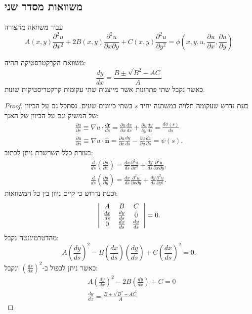 \documentclass{tstextbook}
\begin{document}
\subsection{משוואות מסדר שני}

\begin{definition}
עבור משוואה מהצורה 
$$ A(x,y)\frac{\partial^2u}{\partial x^2}\!+\!2B(x,y)\frac{\partial^2u}{\partial x\partial y}\!+\!C(x,y)\frac{\partial^2u}{\partial y^2}\!=\!\phi\left(\!x,\!y,\!u,\!\!\frac{\partial u}{\partial x},\!\!\frac{\partial u}{\partial y}\right)$$

\end{definition}
\begin{proposition}
משוואת הקרקטרסטיקה תהיה:
$$\frac{dy}{dx}=\frac{B\pm\sqrt{B^2-AC}}{A}$$
כאשר נקבל שתי פתרונות אשר מייצגות שתי עקומות קרקטריסטיקות שונות.

\end{proposition}
\begin{proof}
כעת נדרש שעקומה תלויה במשתנה יחיד \(s\) בשתי כיוונים שונים. נסתכל גם על הכיוון של המשיק וגם על הכיוון של האנך:
$$\begin{array}{l}{{{\frac{\partial u}{\partial s}}\equiv\nabla u\cdot{\frac{d\mathbf{r}}{d s}}={\frac{\partial u}{\partial x}}{\frac{d x}{d s}}+{\frac{\partial u}{\partial y}}{\frac{d y}{d s}}={\frac{d\phi(s)}{d s}}}}\\ {{{\frac{\partial u}{\partial n}}\equiv\nabla u\cdot{\hat{\mathbf{n}}}={\frac{\partial u}{\partial x}}{\frac{d y}{d s}}-{\frac{\partial u}{\partial y}}{\frac{d x}{d s}}=\psi(s).}}\end{array}$$
בעזרת כלל השרשרת ניתן לכתוב:
$$\begin{array}{l}{{\frac{d}{d s}\left(\frac{\partial u}{\partial x}\right)=\frac{d x}{d s}\frac{\partial^{2}u}{\partial x^{2}}+\frac{d y}{d s}\frac{\partial^{2}u}{\partial x\partial y},}}\\ {{\frac{d}{d s}\left(\frac{\partial u}{\partial y}\right)=\frac{d x}{d s}\frac{\partial^{2}u}{\partial x\partial y}+\frac{d y}{d s}\frac{\partial^{2}u}{\partial y^{2}}.}}\end{array}$$
וכעת נדרוש כי קיים ניוון בין כל המשוואות:
$$\left|\begin{array}{c c c}{{A}}&{{B}}&{{C}}\\ {{\frac{d x}{d s}}}&{{\frac{d y}{d s}}}&{{0}}\\ {{0}}&{{\frac{d x}{d s}}}&{{\frac{d y}{d s}}}\end{array}\right|=0.$$
מהדטרמיננטה נקבל:
$$A\left({\frac{d y}{d s}}\right)^{2}-B\left({\frac{d x}{d s}}\right)\left({\frac{d y}{d s}}\right)+C\left({\frac{d x}{d s}}\right)^{2}=0.$$
כאשר ניתן לכפול ב-\(\left( \frac{ds}{dx} \right)^2\) ונקבל:
$$ \begin{aligned}&A\left(\frac{dy}{dx}\right)^2-2B\left(\frac{dy}{dx}\right)+C=0\\&\frac{dy}{dx}=\frac{B\pm\sqrt{B^2-AC}}{A}\end{aligned}$$

\end{proof}
\end{document}
